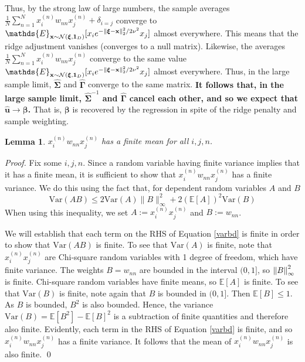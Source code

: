 \documentclass[12pt]{article}  %
\newcommand{\bx}{\mathbf{x}}
\newcommand{\bu}{\mathbf{u}}
\newcommand{\bxi}{\boldsymbol{\xi}}
\newcommand{\bS}{\boldsymbol{\Sigma}}
\newcommand{\bG}{\boldsymbol{\Gamma}}
\newtheorem{lemma}[theorem]{Lemma}
\begin{document}
    Thus, by the strong law of large numbers, the sample averages $\frac{1}{N}\sum_{n=1}^N x_i^{(n)} w_{nn} x_j^{(n)}+\delta_{i=j}$ converge to $\mathds{E}_{\bx \sim \mathcal{N}(\bxi,\mathbf{1}_{D})}[x_i e^{-\norm{\bxi-\bx}_2^2/2\nu^2}x_j]$ almost everywhere. This means that the ridge adjustment vanishes (converges to a null matrix). Likewise, the averages $\frac{1}{N}\sum_{n=1}^N x_i^{(n)} w_{nn} x_j^{(n)}$ converge to the same value $\mathds{E}_{\bx \sim \mathcal{N}(\bxi,\mathbf{1}_{D})}[x_i e^{-\norm{\bxi-\bx}_2^2/2\nu^2}x_j]$ almost everywhere. Thus, in the large sample limit, $\hat{\bS}$ and $\hat{\bG}$ converge to the same matrix. \textbf{It follows that, in the large sample limit, $\hat{\bS}^{-1}$ and $\hat{\bG}$ cancel each other, and so we expect that $\hat{\bu} \rightarrow \boldsymbol{\beta}$.} That is, $\boldsymbol{\beta}$ is recovered by the regression in spite of the ridge penalty and sample weighting. 
    
    
    
    
   
\begin{lemma}
    \label{finitemean}
   $x_i^{(n)} w_{nn} x_j^{(n)}$ has a finite mean for all $i,j,n$. 
\end{lemma}
    \noindent \emph{Proof.} Fix some $i,j,n$. 
    Since a random variable having finite variance implies that it has a finite mean, it is sufficient to show that $x_i^{(n)} w_{nn} x_j^{(n)}$ has a finite variance. We do this using the fact that, for dependent random variables $A$ and $B$
    \begin{equation}
        \label{varbd}
        \mathrm{Var}(AB) \leq  2\mathrm{Var}(A)\lVert B\rVert_\infty^2+2(\mathbb E[A])^2\mathrm{Var}(B)
    \end{equation}
    When using this inequality, we set $A:=x_i^{(n)} x_j^{(n)}$ and $B:=w_{nn}$.

    We will establish that each term on the RHS of Equation \ref{varbd} is finite in order to show that $\mathrm{Var}(AB)$ is finite. To see that $\mathrm{Var}(A)$ is finite, note that $x_i^{(n)} x_j^{(n)}$ are Chi-square random variables with 1 degree of freedom, which have finite variance. The weights $B=w_{nn}$ are bounded in the interval $(0,1]$, so $\norm{B}_\infty^2$ is finite. Chi-square random variables have finite means, so $\mathds{E}[A]$ is finite. To see that $\mathrm{Var}(B)$ is finite, note again that $B$ is bounded in $(0,1]$. Then $\mathds{E}[B] \leq 1$. As $B$ is bounded, $B^2$ is also bounded. Hence, the variance $\mathrm{Var}(B) = \mathds{E}[B^2]-\mathds{E}[B]^2$ is a subtraction of finite quantities and therefore also finite. Evidently, each term in the RHS of Equation \ref{varbd} is finite, and so $x_i^{(n)} w_{nn} x_j^{(n)}$ has a finite variance. It follows that the mean of $x_i^{(n)} w_{nn} x_j^{(n)}$ is also finite.  \qed
\end{document}
